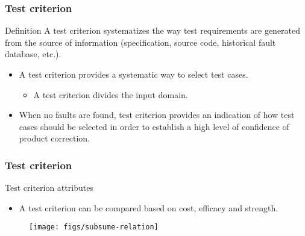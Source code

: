 \begin{frame}[hasprev=true, hasnext=true]
\label{concept:test-criterion}
\frametitle{Test criterion}

\begin{block:concept}{Definition}
A test criterion systematizes the way test requirements are
generated from the source of information (specification, source code,
historical fault database, etc.).
\end{block:concept}

\begin{block:fact}{}
\begin{itemize}
	\item A test criterion provides a systematic way to select test cases.
	\begin{itemize}
		\item A test criterion divides the input domain.
	\end{itemize}

	\item When no faults are found, test criterion provides an indication of
	how test cases should be selected in order to establish a high level of
	confidence of product correction.
\end{itemize}
\end{block:fact}


\hfill
{}
\end{frame}


\begin{frame}
\frametitle{Test criterion}

\begin{block:fact}{Test criterion attributes}
\begin{itemize}
	\item A test criterion can be compared based on cost, efficacy and
	strength.
\end{itemize}
\end{block:fact}

\begin{figure}
    \centering
    \texttt{[image: figs/subsume-relation]}
\end{figure}
\end{frame}


